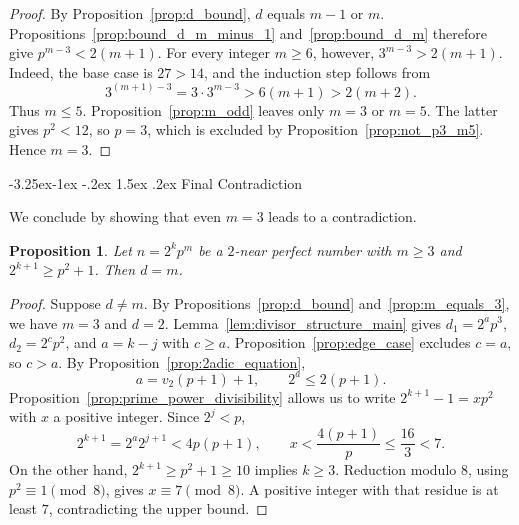 \documentclass[10pt]{article}
\makeatletter
\renewcommand\subsection{\@startsection{subsection}{2}{\z@}
{-3.25ex\@plus -1ex \@minus -.2ex}
{1.5ex \@plus .2ex}
{\normalfont\normalsize\bfseries\boldmath}}
\newtheorem{proposition}{Proposition}
\theoremstyle{definition}
\makeatother
\begin{document}
\begin{proof}
By Proposition~\ref{prop:d_bound}, $d$ equals $m-1$ or $m$.
Propositions~\ref{prop:bound_d_m_minus_1} and~\ref{prop:bound_d_m}
therefore give $p^{m-3}<2(m+1)$.
For every integer $m\ge6$, however, $3^{m-3}>2(m+1)$.
Indeed, the base case is $27>14$, and the induction step follows from
\[
3^{(m+1)-3}=3\cdot3^{m-3}>6(m+1)>2(m+2).
\]
Thus $m\le5$. Proposition~\ref{prop:m_odd} leaves only $m=3$ or
$m=5$. The latter gives $p^2<12$, so $p=3$, which is excluded by
Proposition~\ref{prop:not_p3_m5}. Hence $m=3$.
\end{proof}

\subsection{Final Contradiction}

We conclude by showing that even $m=3$ leads to a contradiction.

\begin{proposition}\label{prop:d_equals_m}
Let $n=2^kp^m$ be a $2$-near perfect number with $m\geq 3$ and $2^{k+1}\geq p^2+1$. Then $d=m$.
\end{proposition}

\begin{proof}
Suppose $d\ne m$. By Propositions~\ref{prop:d_bound}
and~\ref{prop:m_equals_3}, we have $m=3$ and $d=2$.
Lemma~\ref{lem:divisor_structure_main} gives
$d_1=2^ap^3$, $d_2=2^cp^2$, and $a=k-j$ with $c\ge a$.
Proposition~\ref{prop:edge_case} excludes $c=a$, so $c>a$.
By Proposition~\ref{prop:2adic_equation},
\[
a=v_2(p+1)+1,\qquad 2^a\le2(p+1).
\]
Proposition~\ref{prop:prime_power_divisibility} allows us to write
$2^{k+1}-1=xp^2$ with $x$ a positive integer. Since $2^j<p$,
\[
2^{k+1}=2^a2^{j+1}<4p(p+1),
\qquad
x<\frac{4(p+1)}p\le\frac{16}{3}<7.
\]
On the other hand, $2^{k+1}\ge p^2+1\ge10$ implies $k\ge3$.
Reduction modulo $8$, using $p^2\equiv1\pmod8$, gives
$x\equiv7\pmod8$. A positive integer with that residue is at
least $7$, contradicting the upper bound.
\end{proof}
\end{document}
